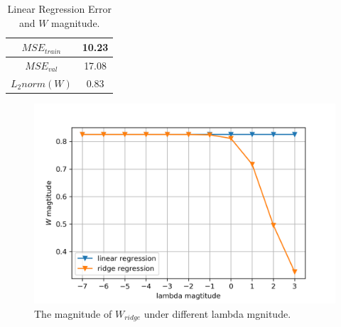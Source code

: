 \documentclass[journal, a4paper]{IEEEtran}
\begin{document}
\begin{table}[!hbt]
	\begin{center}
		\caption{Linear Regression Error and $W$ magnitude.}
		\label{tab:Linear_Regression}
		\begin{tabular}{|c|c|}
			\hline
			$MSE_{train}$ & 10.23    \\
			\hline
			$MSE_{val}$ & 17.08    \\
			\hline
			$L_2norm(W)$ & 0.83  \\
			\hline
		\end{tabular}
	\end{center}
\end{table}

\begin{figure}[!hbt]
	\begin{center}
		\includegraphics[width=\columnwidth]{ridge_w}
		\caption{The magnitude of $W_{ridge}$ under different lambda mgnitude.}
		\label{fig:ridge_w}
	\end{center}
\end{figure} 
\end{document}
